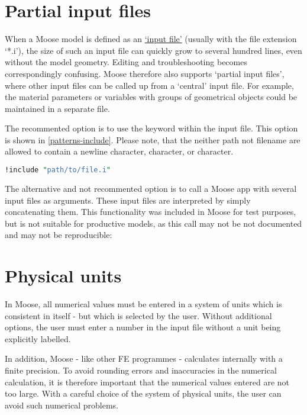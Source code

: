 \section{Partial input files}
\label{chap:patterns-partial-input-files}

When a Moose model is defined as an
\href{https://mooseframework.inl.gov/application_usage/input_syntax.html}{‘input
    file’} (usually with the file extension ‘*.i’), the size of such an input file
can quickly grow to several hundred lines, even without the model geometry.
Editing and troubleshooting becomes correspondingly confusing. Moose therefore
also supports ‘partial input files’, where other input files can be called up
from a ‘central’ input file. For example, the material parameters or variables
with groups of geometrical objects could be maintained in a separate file.

The recommented option is to use the  keyword within the
input file. This option is shown in \autoref{patterns-include}. Please note,
that the neither path not filename are allowed to contain a newline character,
\codeword{#} character, or \codeword{[} character.

\begin{lstlisting}[language=perl, caption={Include anpther input file},label={patterns-include}]
!include "path/to/file.i"
\end{lstlisting}

The alternative and not recommented option is to call a Moose app with several
input files as arguments. These input files are interpreted by simply
concatenating them. This functionality was included in Moose for test purposes,
but is not suitable for productive models, as this call may not be not
documented and may not be reproducible:


\section{Physical units}
\label{chap:patterns-physical-units}

In Moose, all numerical values must be entered in a system of units which is
consistent in itself - but which is selected by the user. Without additional
options, the user must enter a number in the input file without a unit being
explicitly labelled.

In addition, Moose - like other FE programmes - calculates internally with a
finite precision. To avoid rounding errors and inaccuracies in the numerical
calculation, it is therefore important that the numerical values entered are
not too large. With a careful choice of the system of physical units, the user
can avoid such numerical problems.

